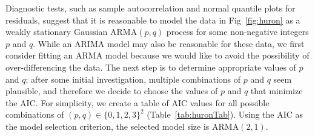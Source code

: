 Diagnostic tests, such as sample autocorrelation and normal quantile plots for residuals, suggest that it is reasonable to model the data in Fig~\ref{fig:huron} as a weakly stationary Gaussian $\text{ARMA}(p, q)$ process for some non-negative integers $p$ and $q$.
While an ARIMA model may also be reasonable for these data, we first consider fitting an ARMA model because we would like to avoid the possibility of over-differencing the data.
The next step is to determine appropriate values of $p$ and $q$;
after some initial investigation, multiple combinations of $p$ and $q$ seem plausible, and therefore we decide to choose the values of $p$ and $q$ that minimize the AIC.
For simplicity, we create a table of AIC values for all possible combinations of $(p, q) \in \{0, 1, 2, 3\}^2$ (Table~\ref{tab:huronTab}).
Using the AIC as the model selection criterion, the selected model size is $\text{ARMA}(2, 1)$.



